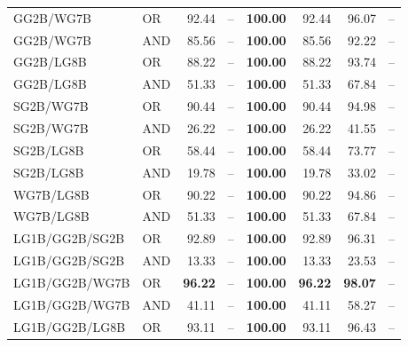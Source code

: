\documentclass{article}
\begin{document}
{\begin{longtable}{llrrrrrr}
 GG2B/WG7B                & OR      & 92.44             & --            & \textbf{100.00} & 92.44             & 96.07             & --    \\
 GG2B/WG7B                & AND     & 85.56             & --            & \textbf{100.00} & 85.56             & 92.22             & --    \\
 GG2B/LG8B                & OR      & 88.22             & --            & \textbf{100.00} & 88.22             & 93.74             & --    \\
 GG2B/LG8B                & AND     & 51.33             & --            & \textbf{100.00} & 51.33             & 67.84             & --    \\
 SG2B/WG7B                & OR      & 90.44             & --            & \textbf{100.00} & 90.44             & 94.98             & --    \\
 SG2B/WG7B                & AND     & 26.22             & --            & \textbf{100.00} & 26.22             & 41.55             & --    \\
 SG2B/LG8B                & OR      & 58.44             & --            & \textbf{100.00} & 58.44             & 73.77             & --    \\
 SG2B/LG8B                & AND     & 19.78             & --            & \textbf{100.00} & 19.78             & 33.02             & --    \\
 WG7B/LG8B                & OR      & 90.22             & --            & \textbf{100.00} & 90.22             & 94.86             & --    \\
 WG7B/LG8B                & AND     & 51.33             & --            & \textbf{100.00} & 51.33             & 67.84             & --    \\
 LG1B/GG2B/SG2B           & OR      & 92.89             & --            & \textbf{100.00} & 92.89             & 96.31             & --    \\
 LG1B/GG2B/SG2B           & AND     & 13.33             & --            & \textbf{100.00} & 13.33             & 23.53             & --    \\
 LG1B/GG2B/WG7B           & OR      & \textbf{96.22}    & --            & \textbf{100.00} & \textbf{96.22}    & \textbf{98.07}    & --    \\
 LG1B/GG2B/WG7B           & AND     & 41.11             & --            & \textbf{100.00} & 41.11             & 58.27             & --    \\
 LG1B/GG2B/LG8B           & OR      & 93.11             & --            & \textbf{100.00} & 93.11             & 96.43             & --    \\

\end{longtable}}
\end{document}
